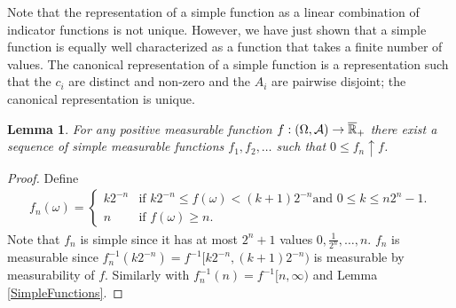 \documentclass{amsart}
\newtheorem{lem}[thm]{Lemma}
\theoremstyle{remark}
\theoremstyle{definition}
\begin{document}
Note that the representation of a simple function as a linear
combination of indicator functions is not unique.  However, we
have
just shown that a simple function is equally well characterized as a
function that takes a finite number of values.  The canonical
representation of a simple function is a representation such that the
$c_i$ are distinct and non-zero and the $A_i$ are pairwise disjoint; the canonical
representation is unique.
\begin{lem}\label{PointwiseApproximationBySimple}For any positive measurable function $f : (\Omega,
  \mathcal{A}) \to \overline{\mathbb{R}}_+$ there exist a sequence of simple measurable
  functions $f_1, f_2, \dots$ such that $0 \leq f_n \uparrow f$.
\end{lem}
\begin{proof}
Define
\begin{align*}
f_n(\omega) = 
\begin{cases}k2^{-n} & \text{if $k2^{-n} \leq f(\omega) < (k+1)2^{-n}$
    and $0 \leq k \leq n2^n -1$.} \\
n & \text{if $f(\omega) \geq n$.}
\end{cases}
\end{align*}
Note that $f_n$ is simple since it has at most $2^n + 1$ values $0,
\frac{1}{2^n}, \dots, n$.  $f_n$ is measurable since
$f_n^{-1}(k2^{-n}) = f^{-1}[k2^{-n},(k+1)2^{-n})$ is measurable by measurability of $f$.  Similarly
with $f_n^{-1}(n) = f^{-1} [n,\infty)$ and Lemma \ref{SimpleFunctions}.
\end{proof}
\end{document}

